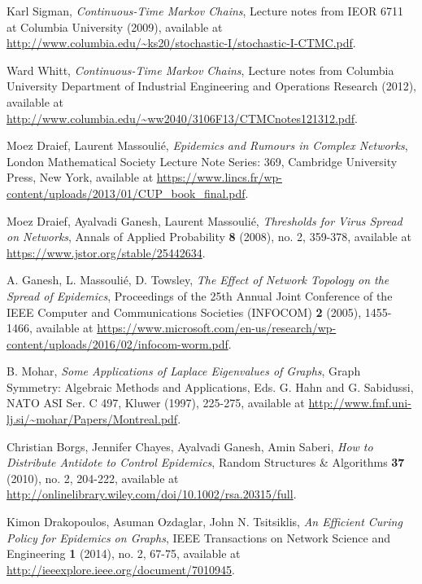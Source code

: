 \documentclass[11pt]{article}
\begin{document}



\begin{thebibliography}{10}

	Karl Sigman,
	\emph{Continuous-Time Markov Chains},
	Lecture notes from IEOR 6711 at Columbia University (2009),
	available at \url{http://www.columbia.edu/~ks20/stochastic-I/stochastic-I-CTMC.pdf}.

	Ward Whitt,
	\emph{Continuous-Time Markov Chains},
	Lecture notes from Columbia University Department of Industrial Engineering and Operations Research (2012),
	available at \url{http://www.columbia.edu/~ww2040/3106F13/CTMCnotes121312.pdf}.

	Moez Draief, Laurent Massouli\'e,
	\emph{Epidemics and Rumours in Complex Networks},
	London Mathematical Society Lecture Note Series: 369, Cambridge University Press, New York,
	available at \url{https://www.lincs.fr/wp-content/uploads/2013/01/CUP_book_final.pdf}.

	Moez Draief, Ayalvadi Ganesh, Laurent Massouli\'e,
	\emph{Thresholds for Virus Spread on Networks},
	Annals of Applied Probability \textbf{8} (2008), no. 2, 359-378,
	available at \url{https://www.jstor.org/stable/25442634}.

	A. Ganesh, L. Massouli\'e, D. Towsley,
	\emph{The Effect of Network Topology on the Spread of Epidemics},
	Proceedings of the 25th Annual Joint Conference of the IEEE Computer and Communications Societies (INFOCOM) \textbf{2} (2005), 1455-1466,
	available at \url{https://www.microsoft.com/en-us/research/wp-content/uploads/2016/02/infocom-worm.pdf}.

	B. Mohar,
	\emph{Some Applications of Laplace Eigenvalues of Graphs},
	Graph Symmetry: Algebraic Methods and Applications, Eds. G. Hahn and G. Sabidussi, NATO ASI Ser. C 497, Kluwer (1997), 225-275,
	available at \url{http://www.fmf.uni-lj.si/~mohar/Papers/Montreal.pdf}.

	Christian Borgs, Jennifer Chayes, Ayalvadi Ganesh, Amin Saberi,
	\emph{How to Distribute Antidote to Control Epidemics},
	Random Structures \& Algorithms \textbf{37} (2010), no. 2, 204-222,
	available at \url{http://onlinelibrary.wiley.com/doi/10.1002/rsa.20315/full}.

	Kimon Drakopoulos, Asuman Ozdaglar, John N. Tsitsiklis,
	\emph{An Efficient Curing Policy for Epidemics on Graphs},
	IEEE Transactions on Network Science and Engineering \textbf{1} (2014), no. 2, 67-75,
	available at \url{http://ieeexplore.ieee.org/document/7010945}.

\end{thebibliography}
\end{document}
